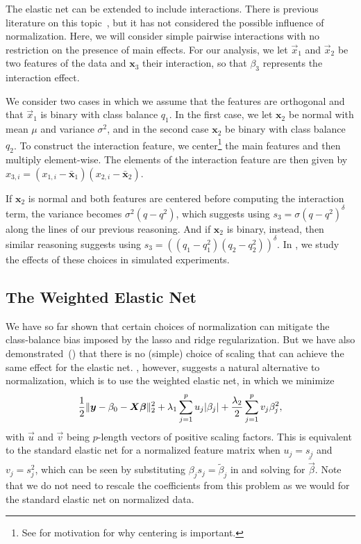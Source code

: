 The elastic net can be extended to include interactions. There is previous literature on
this topic~\citep{bien2013,zemlianskaia2022,lim2015}, but it has not considered the
possible influence of normalization. Here, we will consider simple pairwise interactions
with no restriction on the presence of main effects. For our analysis, we let \(\vec{x}_1\)
and \(\vec{x}_2\) be two features of the data and \(\bm{x}_3\) their interaction, so that
\(\beta_3\) represents the interaction effect.

We consider two cases in which we assume that the features are orthogonal and that
\(\vec{x}_1\) is binary with class balance \(q_1\). In the first case, we let \(\bm{x}_2\)
be normal with mean \(\mu\) and variance \(\sigma^2\), and in the second case \(\bm{x}_2\)
be binary with class balance \(q_2\). To construct the interaction feature, we
center\footnote{See  for motivation for why centering is
  important.} the main features and then multiply element-wise. The elements of the
interaction feature are then given by \(x_{3,i} = (x_{1,i} - \bar{\bm{x}}_1)(x_{2,i} -
\bar{\bm{x}}_2)\).

If \(\bm{x}_2\) is normal and both features are centered before computing the interaction
term, the variance becomes \(\sigma^2 (q-q^2)\), which suggests using \(s_3 = \sigma (q -
q^2)^\delta\) along the lines of our previous reasoning. And if \(\bm{x}_2\) is binary,
instead, then similar reasoning suggests using \(s_3 = ((q_1-q_1^2)(q_2-q_2^2))^\delta\).
In , we study the effects of these choices in simulated
experiments.

\subsection{The Weighted Elastic Net}\label{sec:binary-weighting}

We have so far shown that certain choices of normalization can mitigate the class-balance
bias imposed by the lasso and ridge regularization. But we have also
demonstrated~() that there is no (simple) choice of
scaling that can achieve the same effect for the elastic net.
, however, suggests a natural alternative to normalization,
which is to use the weighted elastic net, in which we minimize
\[
  \frac{1}{2} \lVert \boldsymbol{y} - \beta_0 - \boldsymbol{X}\boldsymbol{\beta}\rVert_2^2 + \lambda_1 \sum_{j=1}^p u_j |\beta_j| + \frac{\lambda_2}{2} \sum_{j=1}^p v_j \beta_j^2,
\]
with \(\vec{u}\) and \(\vec{v}\) being \(p\)-length vectors of positive scaling factors.
This is equivalent to the standard elastic net for a normalized feature matrix when \(u_j =
s_j\) and \(v_j = s_j^2\), which can be seen by substituting \(\beta_js_j =
\tilde{\beta}_j\) in  and solving for \(\tilde{\vec{\beta}}\). Note
that we do not need to rescale the coefficients from this problem as we would for the
standard elastic net on normalized data.

